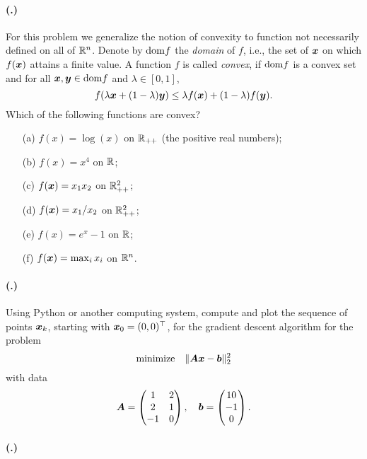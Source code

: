 \documentclass{article}
\newcounter{problemSheetNumber}
\newcounter{problems}
\renewcommand{\problem}{\paragraph{(\theproblemSheetNumber.\theproblems)}\addtocounter{problems}{1}}
\begin{document}
\problem For this problem we generalize the notion of convexity to function not necessarily defined on all of $\mathbb{R}^n$. Denote by $\mathrm{dom} f$ the {\em domain} of $f$, i.e., the set of $\bm{x}$ on which $f(\bm{x})$ attains a finite value. A function $f$ is called {\em convex}, if $\mathrm{dom} f$ is a convex set and for all $\bm{x},\bm{y}\in \mathrm{dom} f$ and $\lambda\in [0,1]$,
\begin{equation*}
 f(\lambda \bm{x}+(1-\lambda)\bm{y})\leq \lambda f(\bm{x})+(1-\lambda)f(\bm{y}).
\end{equation*}
Which of the following functions are convex?
\begin{itemize}
 \item[(a)] $f(x) = \log(x)$ on $\mathbb{R}_{++}$ (the positive real numbers);
 \item[(b)] $f(x) = x^4$ on $\mathbb{R}$;
 \item[(c)] $f(\bm{x}) = x_1x_2$ on $\mathbb{R}^2_{++}$;
 \item[(d)] $f(\bm{x}) = x_1/x_2$ on $\mathbb{R}^2_{++}$;
 \item[(e)] $f(x)=e^x-1$ on $\mathbb{R}$;
 \item[(f)] $f(\bm{x}) = \max_i x_i$ on $\mathbb{R}^n$.
\end{itemize}

\problem Using Python or another computing system, compute and plot the sequence of points $\bm{x}_k$, starting with $\bm{x}_0=(0,0)^{\top}$, for the gradient descent algorithm for the problem
\begin{equation*}
 \text{minimize}\quad \Vert {\bm{A}\bm{x}-\bm{b}}\Vert_2^2
\end{equation*}
with data
 \begin{equation*}
  \bm{A} = \begin{pmatrix}
             1 & 2\\
             2 & 1\\
             -1 & 0
            \end{pmatrix},
\quad \bm{b} = \begin{pmatrix}
                 10\\-1\\0
                \end{pmatrix}.
 \end{equation*}

\problem 
\end{document}
